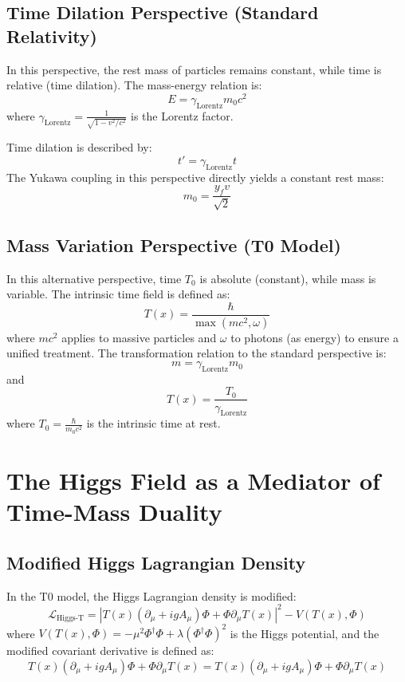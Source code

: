 \documentclass[a4paper,12pt]{article}
\newcommand{\Tfield}{T(x)}
\newcommand{\Tzero}{T_0}
\newcommand{\DhiggsT}{\Tfield (\partial_\mu + ig A_\mu) \Phi + \Phi \partial_\mu \Tfield}
\newcommand{\gammaf}{\gamma_{\text{Lorentz}}}
\begin{document}
	\subsection{Time Dilation Perspective (Standard Relativity)}
	In this perspective, the rest mass of particles remains constant, while time is relative (time dilation). The mass-energy relation is:
	\begin{equation}
		E = \gammaf m_0 c^2
	\end{equation}
	where \( \gammaf = \frac{1}{\sqrt{1-v^2/c^2}} \) is the Lorentz factor.
	
	Time dilation is described by:
	\begin{equation}
		t' = \gammaf t
	\end{equation}
	The Yukawa coupling in this perspective directly yields a constant rest mass:
	\begin{equation}
		m_0 = \frac{y_f v}{\sqrt{2}}
	\end{equation}
	
	\subsection{Mass Variation Perspective (T0 Model)}
	In this alternative perspective, time \( \Tzero \) is absolute (constant), while mass is variable. The intrinsic time field is defined as:
	\begin{equation}
		\Tfield = \frac{\hbar}{\max(m c^2, \omega)}
	\end{equation}
	where \( m c^2 \) applies to massive particles and \( \omega \) to photons (as energy) to ensure a unified treatment. The transformation relation to the standard perspective is:
	\begin{equation}
		m = \gammaf m_0
	\end{equation}
	and
	\begin{equation}
		\Tfield = \frac{\Tzero}{\gammaf}
	\end{equation}
	where \( \Tzero = \frac{\hbar}{m_0 c^2} \) is the intrinsic time at rest.
	
	\section{The Higgs Field as a Mediator of Time-Mass Duality}
	\subsection{Modified Higgs Lagrangian Density}
	In the T0 model, the Higgs Lagrangian density is modified:
	\begin{equation}
		\mathcal{L}_{\text{Higgs-T}} = |\DhiggsT|^2 - V(\Tfield, \Phi)
	\end{equation}
	where \( V(\Tfield, \Phi) = -\mu^2 \Phi^\dagger \Phi + \lambda (\Phi^\dagger \Phi)^2 \) is the Higgs potential, and the modified covariant derivative is defined as:
	\begin{equation}
		\DhiggsT = \Tfield (\partial_\mu + ig A_\mu) \Phi + \Phi \partial_\mu \Tfield
	\end{equation}
	
\end{document}
